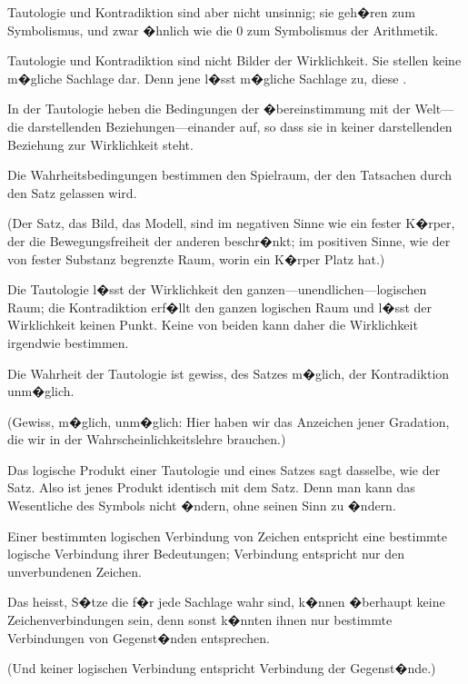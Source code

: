 \begin{propositions}
{Tautologie und Kontradiktion sind aber nicht
unsinnig; sie geh�ren zum Symbolismus, und
zwar �hnlich wie die \glqq{}0\grqq{} zum Symbolismus der
Arithmetik.}


{Tautologie und Kontradiktion sind nicht Bilder
der Wirklichkeit. Sie stellen keine m�gliche
Sachlage dar. Denn jene l�sst  m�gliche
Sachlage zu, diese .

In der Tautologie heben die Bedingungen der
�bereinstimmung mit der Welt---die darstellenden
Beziehungen---einander auf, so dass sie in keiner
darstellenden Beziehung zur Wirklichkeit steht.}


{Die Wahrheitsbedingungen bestimmen den
Spielraum, der den Tatsachen durch den Satz
gelassen wird.

(Der Satz, das Bild, das Modell, sind im
negativen Sinne wie ein fester K�rper, der die
Bewegungsfreiheit der anderen beschr�nkt; im
positiven Sinne, wie der von fester Substanz
begrenzte Raum, worin ein K�rper Platz hat.)

Die Tautologie l�sst der Wirklichkeit den gan\-zen---un\-end\-li\-chen---lo\-gi\-schen
Raum; die Kontradiktion
erf�llt den ganzen logischen Raum und l�sst
der Wirklichkeit keinen Punkt. Keine von beiden
kann daher die Wirklichkeit irgendwie bestimmen.}


{Die Wahrheit der Tautologie ist gewiss, des
Satzes m�glich, der Kontradiktion unm�glich.

(Gewiss, m�glich, unm�glich: Hier haben wir
das Anzeichen jener Gradation, die wir in der
Wahrscheinlichkeitslehre brauchen.)}


{Das logische Produkt einer Tautologie und
eines Satzes sagt dasselbe, wie der Satz. Also ist
jenes Produkt identisch mit dem Satz. Denn man
kann das Wesentliche des Symbols nicht �ndern,
ohne seinen Sinn zu �ndern.}


{Einer bestimmten logischen Verbindung von
Zeichen entspricht eine bestimmte logische Verbindung
ihrer Bedeutungen; 
Verbindung entspricht nur den unverbundenen
Zeichen.

Das heisst, S�tze die f�r jede Sachlage wahr
sind, k�nnen �berhaupt keine Zeichenverbindungen
sein, denn sonst k�nnten ihnen nur bestimmte
Verbindungen von Gegenst�nden entsprechen.

(Und keiner logischen Verbindung entspricht
 Verbindung der Gegenst�nde.)

}
\end{propositions}
